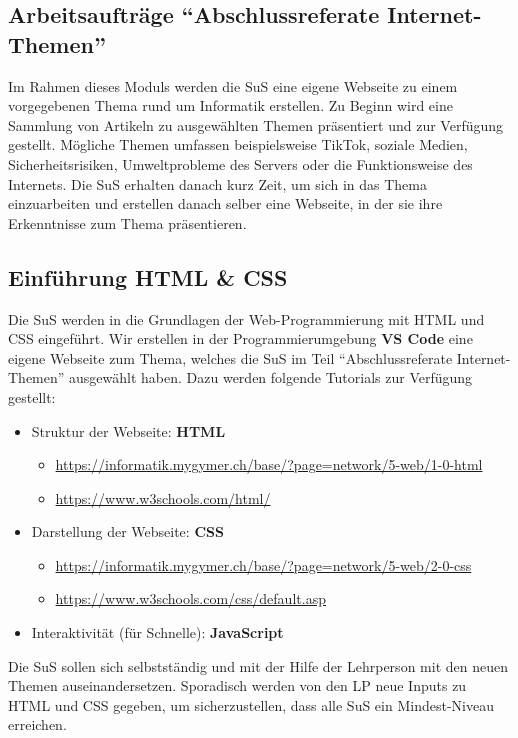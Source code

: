 \subsection{Arbeitsaufträge \enquote{Abschlussreferate Internet-Themen}}
Im Rahmen dieses Moduls werden die SuS eine eigene Webseite zu einem vorgegebenen Thema rund um Informatik erstellen. Zu Beginn wird eine Sammlung von Artikeln zu ausgewählten Themen präsentiert und zur Verfügung gestellt. Mögliche Themen umfassen beispielsweise TikTok, soziale Medien, Sicherheitsrisiken, Umweltprobleme des Servers oder die Funktionsweise des Internets. Die SuS erhalten danach kurz Zeit, um sich in das Thema einzuarbeiten und erstellen danach selber eine Webseite, in der sie ihre Erkenntnisse zum Thema präsentieren.

\subsection{Einführung HTML \& CSS}
Die SuS werden in die Grundlagen der Web-Programmierung mit HTML und CSS eingeführt. Wir erstellen in der Programmierumgebung \textbf{VS Code} eine eigene Webseite zum Thema, welches die SuS im Teil \enquote{Abschlussreferate Internet-Themen} ausgewählt haben. Dazu werden folgende Tutorials zur Verfügung gestellt:

\begin{itemize}
	\item Struktur der Webseite: \textbf{HTML}
	      \begin{itemize}
		      \item \url{https://informatik.mygymer.ch/base/?page=network/5-web/1-0-html}
		      \item \url{https://www.w3schools.com/html/}
	      \end{itemize}
	\item Darstellung der Webseite: \textbf{CSS}
	      \begin{itemize}
		      \item \url{https://informatik.mygymer.ch/base/?page=network/5-web/2-0-css}
		      \item \url{https://www.w3schools.com/css/default.asp}
	      \end{itemize}
	\item Interaktivität (für Schnelle): \textbf{JavaScript}
\end{itemize}

Die SuS sollen sich selbstständig und mit der Hilfe der Lehrperson mit den neuen Themen auseinandersetzen. Sporadisch werden von den LP neue Inputs zu HTML und CSS gegeben, um sicherzustellen, dass alle SuS ein Mindest-Niveau erreichen.

